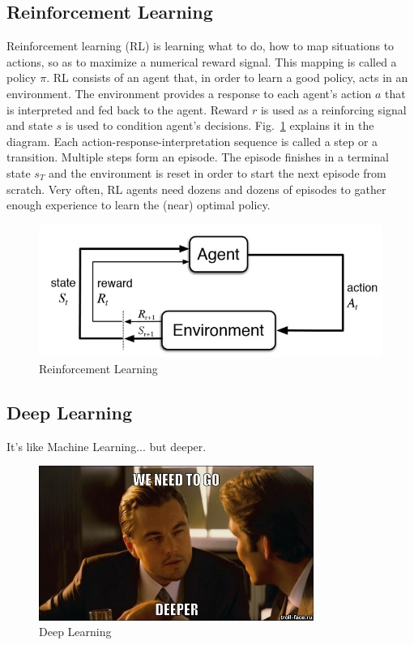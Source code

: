 \subsection{Reinforcement Learning}

Reinforcement learning (RL) is learning what to do, how to map situations to actions, so as to maximize a numerical reward signal.\cite{Book.RLAI} This mapping is called a policy $\pi$. RL consists of an agent that, in order to learn a good policy, acts in an environment. The environment provides a response to each agent's action $a$ that is interpreted and fed back to the agent. Reward $r$ is used as a reinforcing signal and state $s$ is used to condition agent's decisions. Fig.~\ref{Fig.RL} explains it in the diagram.
Each action-response-interpretation sequence is called a step or a transition. Multiple steps form an episode. The episode finishes in a terminal state $s_T$ and the environment is reset in order to start the next episode from scratch. Very often, RL agents need dozens and dozens of episodes to gather enough experience to learn the (near) optimal policy.

\begin{figure}[H]
\includegraphics[]{figures/RL.jpg}
\caption{Reinforcement Learning\protect\cite{Book.RLAI}}
\label{Fig.RL}
\end{figure}


\subsection{Deep Learning}

It's like Machine Learning... but deeper.

\begin{figure}[H]
\includegraphics[width=0.8\textwidth,keepaspectratio]{figures/DL.jpg}
\caption{Deep Learning}
\label{Fig.DL}
\end{figure}
